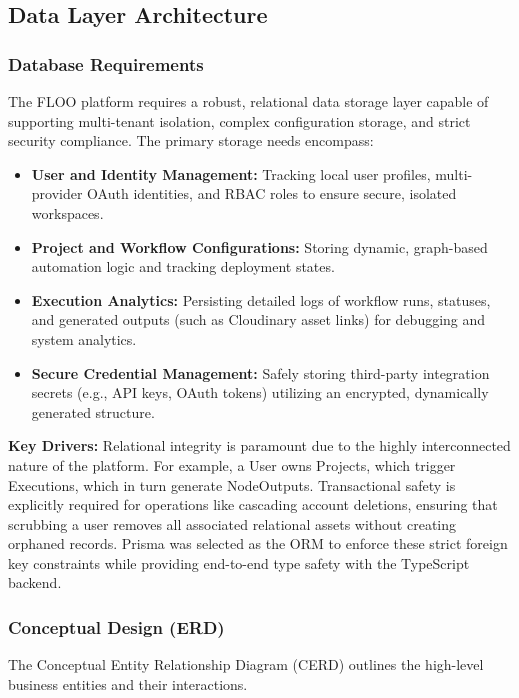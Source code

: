 \subsection{Data Layer Architecture}
\label{subsec:data-layer-architecture}

\subsubsection{Database Requirements}
The FLOO platform requires a robust, relational data storage layer capable of supporting multi-tenant isolation, complex configuration storage, and strict security compliance. The primary storage needs encompass:
\begin{itemize}
    \item \textbf{User and Identity Management:} Tracking local user profiles, multi-provider OAuth identities, and RBAC roles to ensure secure, isolated workspaces.
    \item \textbf{Project and Workflow Configurations:} Storing dynamic, graph-based automation logic and tracking deployment states.
    \item \textbf{Execution Analytics:} Persisting detailed logs of workflow runs, statuses, and generated outputs (such as Cloudinary asset links) for debugging and system analytics.
    \item \textbf{Secure Credential Management:} Safely storing third-party integration secrets (e.g., API keys, OAuth tokens) utilizing an encrypted, dynamically generated structure.
\end{itemize}

\textbf{Key Drivers:} Relational integrity is paramount due to the highly interconnected nature of the platform. For example, a User owns Projects, which trigger Executions, which in turn generate NodeOutputs. Transactional safety is explicitly required for operations like cascading account deletions, ensuring that scrubbing a user removes all associated relational assets without creating orphaned records. Prisma was selected as the ORM to enforce these strict foreign key constraints while providing end-to-end type safety with the TypeScript backend.

\subsubsection{Conceptual Design (ERD)}
The Conceptual Entity Relationship Diagram (CERD) outlines the high-level business entities and their interactions.


